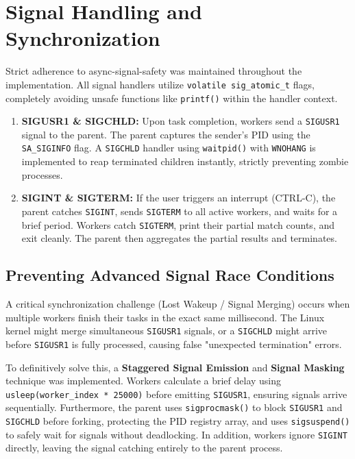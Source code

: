 \documentclass[12pt,a4paper]{article}
\begin{document}
\section{Signal Handling and Synchronization}
Strict adherence to async-signal-safety was maintained throughout the implementation. All signal handlers utilize \texttt{volatile sig\_atomic\_t} flags, completely avoiding unsafe functions like \texttt{printf()} within the handler context.

\begin{enumerate}
    \item \textbf{SIGUSR1 \& SIGCHLD:} Upon task completion, workers send a \texttt{SIGUSR1} signal to the parent. The parent captures the sender's PID using the \texttt{SA\_SIGINFO} flag. A \texttt{SIGCHLD} handler using \texttt{waitpid()} with \texttt{WNOHANG} is implemented to reap terminated children instantly, strictly preventing zombie processes.
    \item \textbf{SIGINT \& SIGTERM:} If the user triggers an interrupt (CTRL-C), the parent catches \texttt{SIGINT}, sends \texttt{SIGTERM} to all active workers, and waits for a brief period. Workers catch \texttt{SIGTERM}, print their partial match counts, and exit cleanly. The parent then aggregates the partial results and terminates.
\end{enumerate}

\subsection{Preventing Advanced Signal Race Conditions}
A critical synchronization challenge (Lost Wakeup / Signal Merging) occurs when multiple workers finish their tasks in the exact same millisecond. The Linux kernel might merge simultaneous \texttt{SIGUSR1} signals, or a \texttt{SIGCHLD} might arrive before \texttt{SIGUSR1} is fully processed, causing false "unexpected termination" errors. 

To definitively solve this, a \textbf{Staggered Signal Emission} and \textbf{Signal Masking} technique was implemented. Workers calculate a brief delay using \texttt{usleep(worker\_index * 25000)} before emitting \texttt{SIGUSR1}, ensuring signals arrive sequentially. Furthermore, the parent uses \texttt{sigprocmask()} to block \texttt{SIGUSR1} and \texttt{SIGCHLD} before forking, protecting the PID registry array, and uses \texttt{sigsuspend()} to safely wait for signals without deadlocking. In addition, workers ignore \texttt{SIGINT} directly, leaving the signal catching entirely to the parent process.
\end{document}
